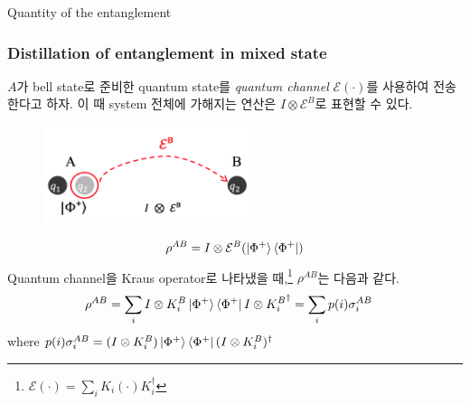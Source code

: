 \documentclass[9pt]{beamer}
\begin{document}
\begin{section}{Quantity of the entanglement}
        \begin{frame}
            \frametitle{Distillation of entanglement in mixed state}
            $A$가 bell state로 준비한 quantum state를 \textit{quantum channel} $\mathcal E(\cdot)$를 사용하여 전송한다고 하자. 이 때 system 전체에 가해지는 연산은 $I \otimes \mathcal E^B$로 표현할 수 있다. 
            \begin{figure}
                \centering
                \includegraphics[width=0.55\textwidth]{image/L7_dist.png}
            \end{figure}
            \begin{equation*}
                \rho^{AB} = I \otimes \mathcal E^B(\ket{\Phi^+} \bra{\Phi^+})
            \end{equation*}
            Quantum channel을 Kraus operator로 나타냈을 때,\footnote{$\mathcal E (\cdot) = \sum_i K_i (\cdot) K_i^\dagger$} $\rho^{AB}$는 다음과 같다.
            \begin{align*}
                \rho^{AB} &= \sum_i I \otimes K_i^B \ket{\Phi^+} \bra{\Phi^+} I \otimes {K^B_i}^\dagger = \sum_i p(i) \sigma_i^{AB}
            \end{align*}
            where $p(i) \sigma_i^{AB} = (I \otimes K_i^B) \ket{\Phi^+} \bra{\Phi^+} (I \otimes K_i^B)^\dagger$
        \end{frame}


\end{section}
\end{document}
